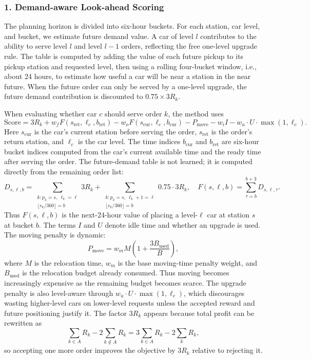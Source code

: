 \documentclass[10pt,a4paper]{article}
\begin{document}
\subsubsection*{1. Demand-aware Look-ahead Scoring}

The planning horizon is divided into six-hour buckets.  For each station, car
level, and bucket, we estimate future demand value.  A car of level $l$
contributes to the ability to serve level $l$ and level $l-1$ orders,
reflecting the free one-level upgrade rule.  The table is computed by adding the
value of each future pickup to its pickup station and requested level, then
using a rolling four-bucket window, i.e., about 24 hours, to estimate how useful
a car will be near a station in the near future.  When the future order can only
be served by a one-level upgrade, the future demand contribution is discounted
to $0.75\times 3R_k$.

When evaluating whether car $c$ should serve order $k$, the method uses
\[
\text{Score}
=3R_k
+ w_f F(s_{\text{ret}}, \ell_c, b_{\text{ret}})
- w_o F(s_{\text{cur}}, \ell_c, b_{\text{cur}})
- P_{\text{move}}
- w_i I
- w_u \cdot U \cdot \max(1,\ell_c).
\]
Here $s_{\text{cur}}$ is the car's current station before serving the order,
$s_{\text{ret}}$ is the order's return station, and $\ell_c$ is the car level.
The time indices $b_{\text{cur}}$ and $b_{\text{ret}}$ are six-hour bucket
indices computed from the car's current available time and the ready time after
serving the order.  The future-demand table is not learned; it is computed
directly from the remaining order list:
\[
D_{s,\ell,b}=\sum_{\substack{k:p_k=s,\ \ell_k=\ell\\
\lfloor s_k/360\rfloor=b}}3R_k
+\sum_{\substack{k:p_k=s,\ \ell_k+1=\ell\\
\lfloor s_k/360\rfloor=b}}0.75\cdot 3R_k,
\quad
F(s,\ell,b)=\sum_{\tau=b}^{b+3}D_{s,\ell,\tau}.
\]
Thus $F(s,\ell,b)$ is the next-24-hour value of placing a level-$\ell$ car at
station $s$ at bucket $b$.  The terms $I$ and $U$ denote idle time and whether
an upgrade is used.
The moving penalty is dynamic:
\[
P_{\text{move}}=w_m M\left(1+\frac{3B_{\text{used}}}{B}\right),
\]
where $M$ is the relocation time, $w_m$ is the base moving-time penalty weight,
and $B_{\text{used}}$ is the relocation budget already consumed.  Thus moving
becomes increasingly expensive as the remaining budget becomes scarce.  The
upgrade penalty is also level-aware through
$w_u\cdot U\cdot\max(1,\ell_c)$, which discourages wasting higher-level cars on
lower-level requests unless the accepted reward and future positioning justify
it.  The factor $3R_k$ appears because total profit can be rewritten as
\[
\sum_{k\in A} R_k-2\sum_{k\notin A}R_k
=3\sum_{k\in A}R_k-2\sum_k R_k,
\]
so accepting one more order improves the objective by $3R_k$ relative to
rejecting it.
\end{document}
